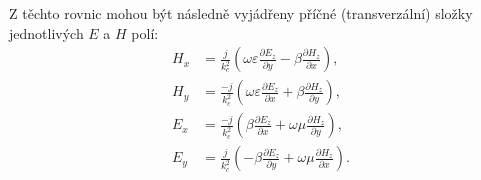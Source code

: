 \documentclass[12pt,a4paper,oneside]{article}
\numberwithin{equation}{section} %
\numberwithin{figure}{section} %
\numberwithin{table}{section} %
\begin{document}
Z těchto rovnic mohou být následně vyjádřeny příčné (transverzální) složky jednotlivých $E$ a $H$ polí:
\begin{subequations}
\label{vyjadreno}
\begin{align}
H_x &= \frac{j}{k^2_c} \left( \omega \varepsilon \frac{\partial E_z}{\partial y} - \beta \frac{\partial H_z}{\partial x} \right) ,
\\
H_y &= \frac{-j}{k^2_c} \left( \omega \varepsilon \frac{\partial E_z}{\partial x} + \beta \frac{\partial H_z}{\partial y} \right) ,
\\
E_x &= \frac{-j}{k^2_c} \left( \beta \frac{\partial E_z}{\partial x} + \omega \mu \frac{\partial H_z}{\partial y} \right) ,
\\
E_y &= \frac{j}{k^2_c} \left(- \beta \frac{\partial E_z}{\partial y} + \omega \mu \frac{\partial H_z}{\partial x} \right) .
\end{align}
\end{subequations}
\end{document}
